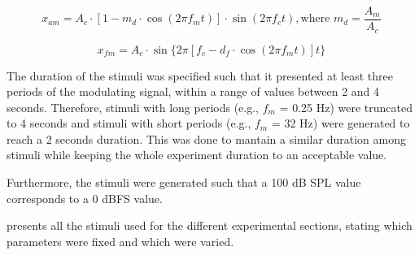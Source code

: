 \documentclass[../main.tex]{subfiles}
\begin{document}
\begin{equation}
  x_{am} = A_c \cdot [1 - m_d \cdot \cos(2 \pi f_m t)] \cdot \sin(2 \pi f_c t),
 \text{where } m_d = \frac{A_m}{A_c}
  \label{eq:am}
\end{equation}

\begin{equation}
  x_{fm} = A_c \cdot \sin \{2 \pi [f_c - d_f \cdot \cos(2 \pi f_m t)] t \}
  \label{eq:fm}
\end{equation}

The duration of the stimuli was specified such that it presented at least three
periods of the modulating signal, within a range of values between 2 and 4
seconds. Therefore, stimuli with long periods (e.g., $f_m$ = 0.25 Hz) were
truncated to 4 seconds and stimuli with short periods (e.g., $f_m$ = 32 Hz) were
generated to reach a 2 seconds duration. This was done to mantain a similar
duration among stimuli while keeping the whole experiment duration to an
acceptable value.

Furthermore, the stimuli were generated such that a 100 dB SPL value
corresponds to a 0 dBFS value.

 presents all the stimuli used for the different experimental
sections, stating which parameters were fixed and which were varied.
\end{document}
